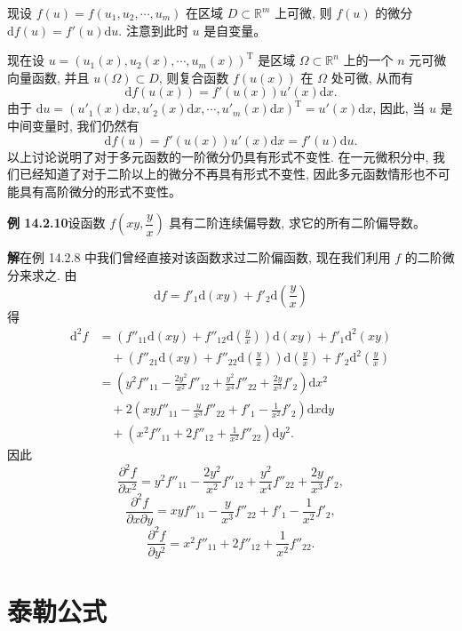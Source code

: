 \documentclass[UTF8,12pt,a4paper,fontset=fandol]{ctexart}
\begin{document}
现设 $f(u)=f(u_1,u_2,\cdots,u_m)$ 在区域 $D\subset\mathbb R^m$ 上可微, 则 $f(u)$ 的微分 $\mathrm df(u)=f'(u)\mathrm du$. 注意到此时 $u$ 是自变量。

现在设 $u=(u_1(x),u_2(x),\cdots,u_m(x))^\mathrm T$ 是区域 $\Omega\subset\mathbb R^n$ 上的一个 $n$ 元可微向量函数, 并且 $u(\Omega)\subset D$, 则复合函数 $f(u(x))$ 在 $\Omega$ 处可微, 从而有
\[
  \mathrm df(u(x))=f'(u(x))u'(x)\mathrm dx.
\]
由于 $\mathrm du=(u'_1(x)\mathrm dx,u'_2(x)\mathrm dx,\cdots,u'_m(x)\mathrm dx)^\mathrm T=u'(x)\mathrm dx$, 因此, 当 $u$ 是中间变量时, 我们仍然有
\[
  \mathrm df(u)=f'(u(x))u'(x)\mathrm dx=f'(u)\mathrm du.
\]
以上讨论说明了对于多元函数的一阶微分仍具有形式不变性. 在一元微积分中, 我们已经知道了对于二阶以上的微分不再具有形式不变性, 因此多元函数情形也不可能具有高阶微分的形式不变性。

\noindent\textbf{例 14.2.10}\quad 设函数 $f\left(xy,\dfrac yx\right)$ 具有二阶连续偏导数, 求它的所有二阶偏导数。

\noindent\textbf{解}\quad 在例 14.2.8 中我们曾经直接对该函数求过二阶偏函数, 现在我们利用 $f$ 的二阶微分来求之. 由
\[
  \mathrm df=f'_1\mathrm d(xy)+f'_2\mathrm d\left(\frac yx\right)
\]
得
\[
\begin{aligned}
  \mathrm d^2f
  &=\left(f''_{11}\mathrm d(xy)+f''_{12}\mathrm d\left(\frac yx\right)\right)\mathrm d(xy)
  +f'_1\mathrm d^2(xy)\\
  &\quad+\left(f''_{21}\mathrm d(xy)+f''_{22}\mathrm d\left(\frac yx\right)\right)
  \mathrm d\left(\frac yx\right)+f'_2\mathrm d^2\left(\frac yx\right)\\
  &=\left(y^2f''_{11}-\frac{2y^2}{x^2}f''_{12}
  +\frac{y^2}{x^4}f''_{22}+\frac{2y}{x^3}f'_2\right)\mathrm dx^2\\
  &\quad+2\left(xyf''_{11}-\frac y{x^3}f''_{22}
  +f'_1-\frac1{x^2}f'_2\right)\mathrm dx\mathrm dy\\
  &\quad+\left(x^2f''_{11}+2f''_{12}+\frac1{x^2}f''_{22}\right)\mathrm dy^2.
\end{aligned}
\]
因此
\[
  \frac{\partial^2 f}{\partial x^2}
  =y^2f''_{11}-\frac{2y^2}{x^2}f''_{12}
  +\frac{y^2}{x^4}f''_{22}+\frac{2y}{x^3}f'_2,
\]
\[
  \frac{\partial^2 f}{\partial x\partial y}
  =xyf''_{11}-\frac y{x^3}f''_{22}
  +f'_1-\frac1{x^2}f'_2,
\]
\[
  \frac{\partial^2 f}{\partial y^2}
  =x^2f''_{11}+2f''_{12}+\frac1{x^2}f''_{22}.
\]

\section{泰勒公式}
\end{document}
